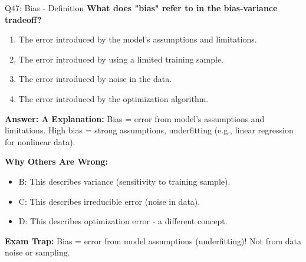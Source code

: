 \documentclass[8pt]{beamer}
\begin{document}
	\begin{frame}{Q47: Bias - Definition}
		\fontsize{6.5}{7.5}\selectfont
		\textbf{What does "bias" refer to in the bias-variance tradeoff?}
		
		\begin{enumerate}
			\item The error introduced by the model's assumptions and limitations.
			\item The error introduced by using a limited training sample.
			\item The error introduced by noise in the data.
			\item The error introduced by the optimization algorithm.
		\end{enumerate}
		
		\vspace{0.05cm}
		\textcolor{myblue}{\textbf{Answer: A}}
		\vspace{0.05cm}
		\textcolor{myblue}{\textbf{Explanation:}} Bias = error from model's assumptions and limitations. High bias = strong assumptions, underfitting (e.g., linear regression for nonlinear data).
		
		\vspace{0.05cm}
		\textcolor{myred}{\textbf{Why Others Are Wrong:}}
		\begin{itemize}
			\item \textcolor{myred}{B:} This describes variance (sensitivity to training sample).
			\item \textcolor{myred}{C:} This describes irreducible error (noise in data).
			\item \textcolor{myred}{D:} This describes optimization error - a different concept.
		\end{itemize}
		
		\textcolor{myred}{\textbf{Exam Trap:}} Bias = \textcolor{myblue}{error from model assumptions} (underfitting)! Not from data noise or sampling.
	\end{frame}
	
\end{document}
